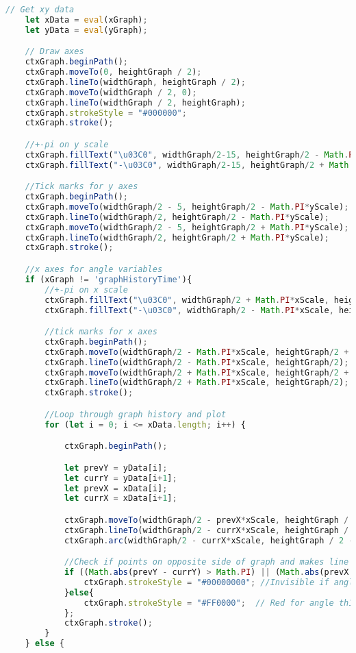 \documentclass[12pt]{article}
\begin{document}
\begin{lstlisting}[language=JavaScript]
    // Get xy data
    let xData = eval(xGraph);
    let yData = eval(yGraph);

    // Draw axes
    ctxGraph.beginPath();
    ctxGraph.moveTo(0, heightGraph / 2);
    ctxGraph.lineTo(widthGraph, heightGraph / 2);
    ctxGraph.moveTo(widthGraph / 2, 0);
    ctxGraph.lineTo(widthGraph / 2, heightGraph);
    ctxGraph.strokeStyle = "#000000";
    ctxGraph.stroke();

    //+-pi on y scale
    ctxGraph.fillText("\u03C0", widthGraph/2-15, heightGraph/2 - Math.PI*yScale + 5);
    ctxGraph.fillText("-\u03C0", widthGraph/2-15, heightGraph/2 + Math.PI*yScale + 5);

    //Tick marks for y axes
    ctxGraph.beginPath();
    ctxGraph.moveTo(widthGraph/2 - 5, heightGraph/2 - Math.PI*yScale);
    ctxGraph.lineTo(widthGraph/2, heightGraph/2 - Math.PI*yScale);
    ctxGraph.moveTo(widthGraph/2 - 5, heightGraph/2 + Math.PI*yScale);
    ctxGraph.lineTo(widthGraph/2, heightGraph/2 + Math.PI*yScale);
    ctxGraph.stroke();

    //x axes for angle variables
    if (xGraph != 'graphHistoryTime'){
        //+-pi on x scale
        ctxGraph.fillText("\u03C0", widthGraph/2 + Math.PI*xScale, heightGraph/2 + 20);
        ctxGraph.fillText("-\u03C0", widthGraph/2 - Math.PI*xScale, heightGraph/2 + 20);

        //tick marks for x axes
        ctxGraph.beginPath();
        ctxGraph.moveTo(widthGraph/2 - Math.PI*xScale, heightGraph/2 + 5);
        ctxGraph.lineTo(widthGraph/2 - Math.PI*xScale, heightGraph/2);
        ctxGraph.moveTo(widthGraph/2 + Math.PI*xScale, heightGraph/2 + 5);
        ctxGraph.lineTo(widthGraph/2 + Math.PI*xScale, heightGraph/2);
        ctxGraph.stroke();

        //Loop through graph history and plot
        for (let i = 0; i <= xData.length; i++) {

            ctxGraph.beginPath();

            let prevY = yData[i];
            let currY = yData[i+1];
            let prevX = xData[i];
            let currX = xData[i+1];

            ctxGraph.moveTo(widthGraph/2 - prevX*xScale, heightGraph / 2 - prevY * yScale);
            ctxGraph.lineTo(widthGraph/2 - currX*xScale, heightGraph / 2 - currY * yScale);
            ctxGraph.arc(widthGraph/2 - currX*xScale, heightGraph / 2 - currY * yScale, 1, 0, 2* Math.PI);

            //Check if points on opposite side of graph and makes line invisible
            if ((Math.abs(prevY - currY) > Math.PI) || (Math.abs(prevX - currX) > Math.PI)){
                ctxGraph.strokeStyle = "#00000000"; //Invisible if angle greater than 2PI
            }else{
                ctxGraph.strokeStyle = "#FF0000";  // Red for angle th1
            };
            ctxGraph.stroke();
        }
    } else {


\end{lstlisting}
\end{document}
